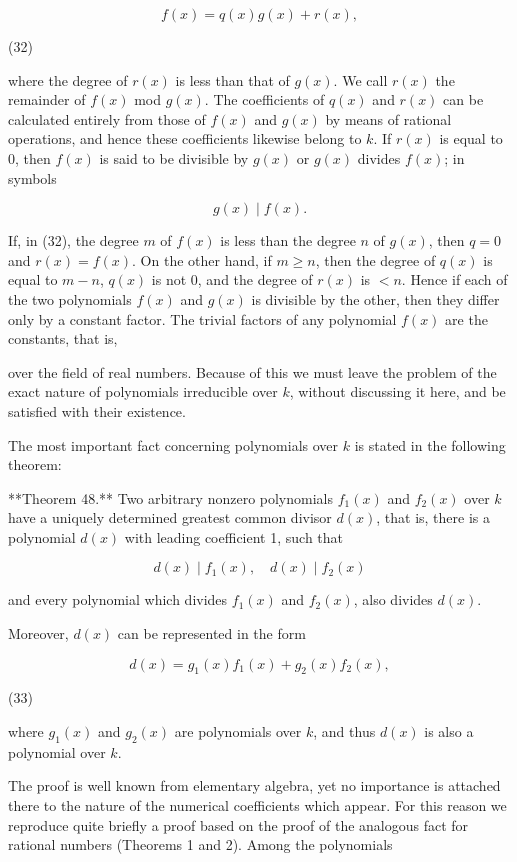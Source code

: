 $$f(x) = q(x)g(x) + r(x),$$

(32)

where the degree of $r(x)$ is less than that of $g(x)$. We call $r(x)$ the remainder of $f(x)$ mod $g(x)$. The coefficients of $q(x)$ and $r(x)$ can be calculated entirely from those of $f(x)$ and $g(x)$ by means of rational operations, and hence these coefficients likewise belong to $k$. If $r(x)$ is equal to 0, then $f(x)$ is said to be divisible by $g(x)$ or $g(x)$ divides $f(x)$; in symbols

$$g(x) \mid f(x).$$

If, in (32), the degree $m$ of $f(x)$ is less than the degree $n$ of $g(x)$, then $q = 0$ and $r(x) = f(x)$. On the other hand, if $m \geq n$, then the degree of $q(x)$ is equal to $m - n$, $q(x)$ is not 0, and the degree of $r(x)$ is $< n$. Hence if each of the two polynomials $f(x)$ and $g(x)$ is divisible by the other, then they differ only by a constant factor. The trivial factors of any polynomial $f(x)$ are the constants, that is,

over the field of real numbers. Because of this we must leave the problem of the exact nature of polynomials irreducible over $k$, without discussing it here, and be satisfied with their existence.

The most important fact concerning polynomials over $k$ is stated in the following theorem:

**Theorem 48.** Two arbitrary nonzero polynomials $f_1(x)$ and $f_2(x)$ over $k$ have a uniquely determined greatest common divisor $d(x)$, that is, there is a polynomial $d(x)$ with leading coefficient 1, such that

$$d(x) \mid f_1(x), \quad d(x) \mid f_2(x)$$

and every polynomial which divides $f_1(x)$ and $f_2(x)$, also divides $d(x)$.

Moreover, $d(x)$ can be represented in the form

$$d(x) = g_1(x)f_1(x) + g_2(x)f_2(x),$$

(33)

where $g_1(x)$ and $g_2(x)$ are polynomials over $k$, and thus $d(x)$ is also a polynomial over $k$.

The proof is well known from elementary algebra, yet no importance is attached there to the nature of the numerical coefficients which appear. For this reason we reproduce quite briefly a proof based on the proof of the analogous fact for rational numbers (Theorems 1 and 2). Among the polynomials


